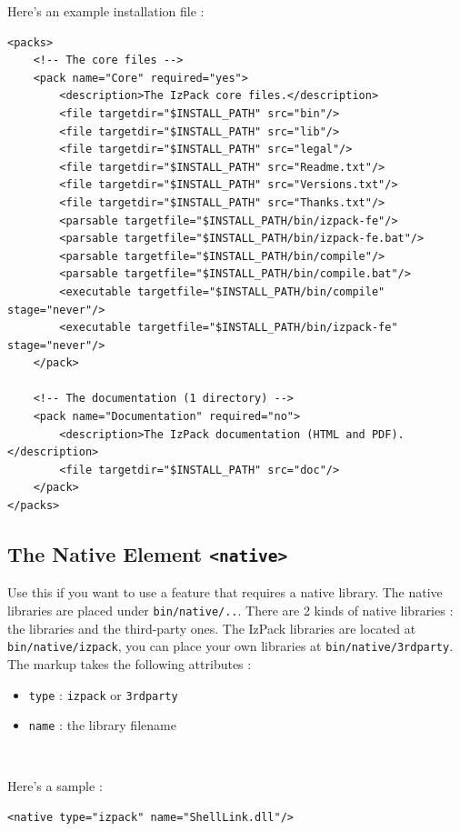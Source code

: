 Here's an example installation file :
\footnotesize
\begin{verbatim}
<packs>
    <!-- The core files -->
    <pack name="Core" required="yes">
        <description>The IzPack core files.</description>
        <file targetdir="$INSTALL_PATH" src="bin"/>
        <file targetdir="$INSTALL_PATH" src="lib"/>
        <file targetdir="$INSTALL_PATH" src="legal"/>
        <file targetdir="$INSTALL_PATH" src="Readme.txt"/>
        <file targetdir="$INSTALL_PATH" src="Versions.txt"/>
        <file targetdir="$INSTALL_PATH" src="Thanks.txt"/>
        <parsable targetfile="$INSTALL_PATH/bin/izpack-fe"/>
        <parsable targetfile="$INSTALL_PATH/bin/izpack-fe.bat"/>
        <parsable targetfile="$INSTALL_PATH/bin/compile"/>
        <parsable targetfile="$INSTALL_PATH/bin/compile.bat"/>
        <executable targetfile="$INSTALL_PATH/bin/compile" stage="never"/>
        <executable targetfile="$INSTALL_PATH/bin/izpack-fe" stage="never"/>
    </pack>
    
    <!-- The documentation (1 directory) -->
    <pack name="Documentation" required="no">
        <description>The IzPack documentation (HTML and PDF).</description>
        <file targetdir="$INSTALL_PATH" src="doc"/>
    </pack>
</packs>
\end{verbatim}
\normalsize

\subsection{The Native Element \texttt{<native>}}

Use this if you want to use a feature that requires a native library.
The native libraries are placed under \texttt{bin/native/..}. There are 2
kinds of native libraries : the \IzPack libraries and the third-party
ones. The IzPack libraries are located at \texttt{bin/native/izpack},
you can place your own libraries at \texttt{bin/native/3rdparty}. The
markup takes the following attributes :
\begin{itemize}

  \item \texttt{type} : \texttt{izpack} or \texttt{3rdparty}
  \item \texttt{name} : the library filename

\end{itemize}\

Here's a sample :
\footnotesize
\begin{verbatim}
<native type="izpack" name="ShellLink.dll"/>
\end{verbatim}
\normalsize

